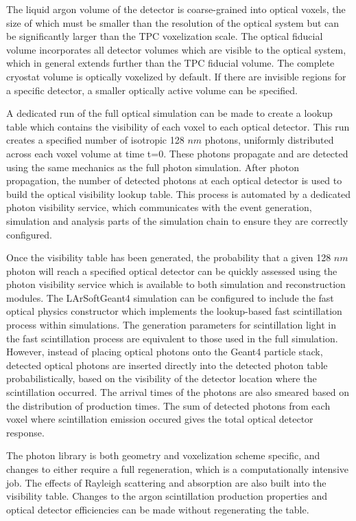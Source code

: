 \documentclass[12pt]{elsarticle}
\newcommand{\larsoft}{LArSoft}
\begin{document}
The liquid argon volume of the detector is coarse-grained into optical voxels, the size of which must be smaller than the resolution of the optical system but can be significantly larger than the TPC voxelization scale.  The optical fiducial volume incorporates all detector volumes which are visible to the optical system, which in general extends further than the TPC fiducial volume.  The complete cryostat volume is optically voxelized by default. If there are invisible regions for a specific detector, a smaller optically active volume can be specified.

A dedicated run of the full optical simulation can be made to create a lookup table which contains the visibility of each voxel to each optical detector.  This run creates a specified number of isotropic 128 $nm$ photons, uniformly distributed across each voxel volume at time t=0.  These photons propagate and are detected using the same mechanics as the full photon simulation.  After photon propagation, the number of detected photons at each optical detector is used to build the optical visibility lookup table.  This process is automated by a dedicated photon visibility service, which communicates with the event generation, simulation and analysis parts of the simulation chain to ensure they are correctly configured.

Once the visibility table has been generated, the probability that a given 128 $nm$ photon will reach a specified optical detector can be quickly assessed using the photon visibility service which is available to both simulation and reconstruction modules.  The \larsoft Geant4 simulation can be configured to include the fast optical physics constructor which implements the lookup-based fast scintillation process within simulations. The generation parameters for scintillation light in the fast scintillation process are equivalent to those used in the full simulation.  However, instead of placing optical photons onto the Geant4 particle stack, detected optical photons are inserted directly into the detected photon table probabilistically, based on the visibility of the detector location where the scintillation occurred.  The arrival times of the photons are also smeared based on the distribution of production times.  The sum of detected photons from each voxel where scintillation emission occured gives the total optical detector response.

The photon library is both geometry and voxelization scheme specific, and changes to either require a full regeneration, which is a computationally intensive job.  The effects of Rayleigh scattering and absorption are also built into the visibility table.  Changes to the argon scintillation production properties and optical detector efficiencies can be made without regenerating the table.
\end{document}

